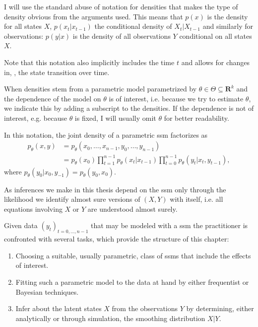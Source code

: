 \begin{notation}
    I will use the standard abuse of notation for densities that makes the type of density \glqq{}obvious\grqq{} from the arguments used.
    This means that $p(x)$ is the density for all states $X$, $p(x_t|x_{t - 1})$ the conditional density of $X_t|X_{t - 1}$ and similarly for observations: $p(y|x)$ is the density of all observations $Y$ conditional on all states $X$.

    Note that this notation also implicitly includes the time $t$ and allows for changes in, \eg, the state transition over time.

    When densities stem from a parametric model parametrized by $\theta \in \Theta \subseteq \mathbf{R}^{k}$ and the dependence of the model on $\theta$ is of interest, i.e. because we try to estimate $\theta$, we indicate this by adding a subscript to the densities.
    If the dependence is not of interest, e.g. because $\theta$ is fixed, I will usually omit $\theta$ for better readability.

    In this notation, the joint density of a parametric \gls{ssm} factorizes as
    \begin{align*}
        p_\theta(x,y) & = p_\theta(x_0, \dots, x_{n - 1}, y_0, \dots, y_{n - 1})                                                              \\
                      & = p_\theta (x_0)\prod_{t = 1}^{n - 1} p_\theta(x_{t}|x_{t - 1}) \prod_{t = 0}^{n - 1} p_\theta(y_t | x_t, y_{t - 1}),
    \end{align*}
    where $p_\theta(y_0|x_0, y_{-1}) = p_\theta(y_0, x_0)$.

    As inferences we make in this thesis depend on the \gls{ssm} only through the likelihood we identify almost sure versions of $(X, Y)$ with itself, i.e. all equations involving $X$ or $Y$ are understood almost surely.
\end{notation}

Given data $(y_t)_{t = 0, \dots, n - 1}$ that may be modeled with a \gls{ssm} the practitioner is confronted with several tasks, which provide the structure of this chapter:

\begin{enumerate}
    \item\label{it:model_choice} Choosing a suitable, usually parametric, class of \glspl{ssm} that include the effects of interest.
    \item\label{it:model_fitting} Fitting such a parametric model to the data at hand by either frequentist or Bayesian techniques.
    \item\label{it:smoothing_problem} Infer about the latent states $X$ from the observations $Y$ by determining, either analytically or through simulation, the smoothing distribution $X|Y$.
\end{enumerate}

